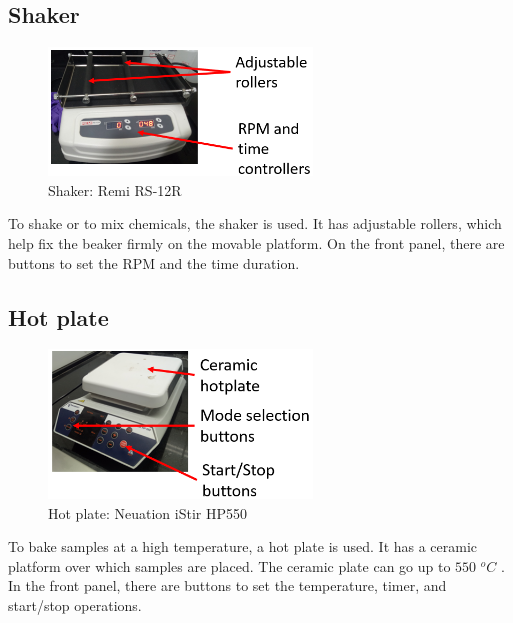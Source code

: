 \documentclass[12pt,a4paper,bold]{thesis}
\theoremstyle{thm}
\theoremstyle{definition}
\begin{document}
\subsection{Shaker}
\begin{figure}[H]
	\centering
   \includegraphics[width=7cm]{Images/5.png} 
   \caption{Shaker: Remi RS-12R}
\end{figure}
\indent\indent\indent To shake or to mix chemicals, the shaker is used. It has adjustable rollers, which help fix the beaker firmly on the movable platform. On the front panel, there are buttons to set the RPM and the time duration.

\subsection{Hot plate}
\begin{figure}[H]
	\centering
   \includegraphics[width=7cm]{Images/6.png} 
   \caption{Hot plate: Neuation iStir HP550}
\end{figure}
\indent\indent\indent To bake samples at a high temperature, a hot plate is used. It has a ceramic platform over which samples are placed. The ceramic plate can go up to $550$ $^oC$ . In the front panel, there are buttons to set the temperature, timer, and start/stop operations.
\end{document}
